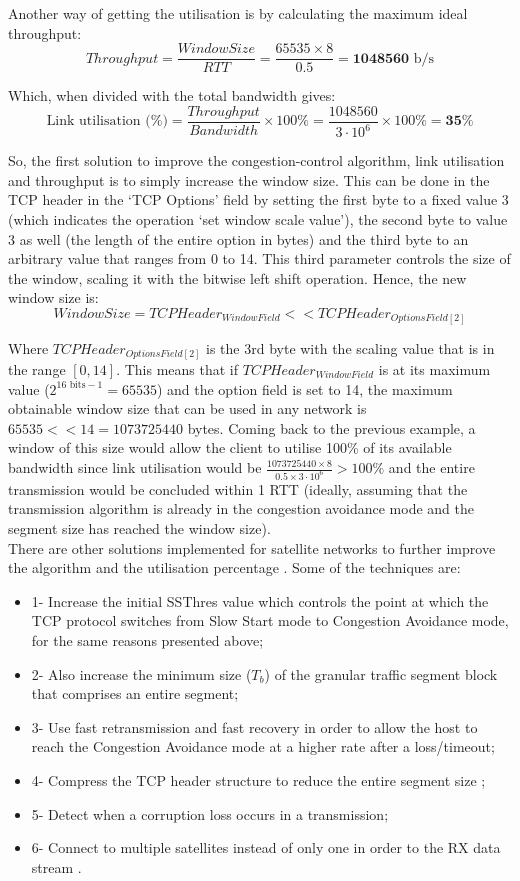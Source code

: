 Another way of getting the utilisation is by calculating the maximum ideal throughput:
$$Throughput = \dfrac{WindowSize}{RTT} = \dfrac{65535\times 8}{0.5} = \mathbf{1048560} \text{ b/s}$$

Which, when divided with the total bandwidth gives:
$$\text{Link utilisation (\%)} = \dfrac{Throughput}{Bandwidth}\times 100\% = \dfrac{1048560}{3\cdot 10^6}\times 100\% = \mathbf{35}\%$$

So, the first solution to improve the congestion-control algorithm, link utilisation and throughput is to simply increase the window size. This can be done in the TCP header in the `TCP Options' field by setting the first byte to a fixed value 3 (which indicates the operation `set window scale value'), the second byte to value 3 as well (the length of the entire option in bytes) and the third byte to an arbitrary value that ranges from 0 to 14. This third parameter controls the size of the window, scaling it with the bitwise left shift operation. Hence, the new window size is: $$WindowSize = TCPHeader_{WindowField} << TCPHeader_{OptionsField[2]}$$

Where $TCPHeader_{OptionsField[2]}$ is the 3rd byte with the scaling value that is in the range $[0, 14]$. This means that if $TCPHeader_{WindowField}$ is at its maximum value ($2^{16\text{ bits} - 1} = 65535$) and the option field is set to 14, the maximum obtainable window size that can be used in any network is $65535 << 14 = 1073725440$ bytes. Coming back to the previous example, a window of this size would allow the client to utilise 100\% of its available bandwidth since link utilisation would be $\frac{1073725440\times 8}{0.5\times 3\cdot10^6} > 100\%$ and the entire transmission would be concluded within 1 RTT (ideally, assuming that the transmission algorithm is already in the congestion avoidance mode and the segment size has reached the window size).\\

There are other solutions implemented for satellite networks to further improve the algorithm and the utilisation percentage\autocite{book1_pp269} . Some of the techniques are:

\begin{itemize}
\item 1- Increase the initial SSThres value which controls the point at which the TCP protocol switches from Slow Start mode to Congestion Avoidance mode, for the same reasons presented above;
\item 2- Also increase the minimum size ($T_b$) of the granular traffic segment block that comprises an entire segment;
\item 3- Use fast retransmission and fast recovery in order to allow the host to reach the Congestion Avoidance mode at a higher rate after a loss/timeout;
\item 4- Compress the TCP header structure to reduce the entire segment size\autocite{book2_pp355} ;
\item 5- Detect when a corruption loss occurs in a transmission;
\item 6- Connect to multiple satellites instead of only one in order to  the RX data stream\autocite{book2_pp355} .
\end{itemize}